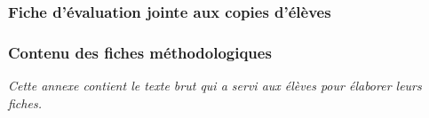 \subsubsection{Fiche d'évaluation jointe aux copies d'élèves}\label{comp}
\begin{figure}[!h]
\end{figure}

\newpage
\subsubsection{Contenu des fiches méthodologiques}\label{methodo}
\textit{Cette annexe contient le texte brut qui a servi aux élèves pour élaborer leurs fiches.}

